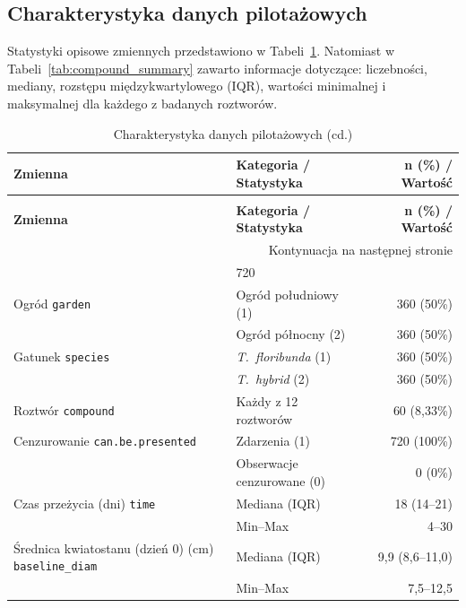 \documentclass[12pt, a4paper]{article}
\begin{document}
\subsection{Charakterystyka danych pilotażowych}
Statystyki opisowe zmiennych przedstawiono w Tabeli~\ref{tab:pilot_summary}. Natomiast w Tabeli~\ref{tab:compound_summary} zawarto informacje dotyczące: liczebności, mediany, rozstępu międzykwartylowego (IQR), wartości minimalnej i maksymalnej dla każdego z badanych roztworów.

\begin{longtable}{p{6cm}lr}
\caption{Charakterystyka danych pilotażowych}
\label{tab:pilot_summary} \\
\toprule
\textbf{Zmienna} & \textbf{Kategoria / Statystyka} & \textbf{n (\%) / Wartość} \\
\midrule
\endfirsthead
\caption[]{Charakterystyka danych pilotażowych (cd.)} \\
\toprule
\textbf{Zmienna} & \textbf{Kategoria / Statystyka} & \textbf{n (\%) / Wartość} \\
\midrule
\endhead
\midrule
\multicolumn{3}{r}{Kontynuacja na następnej stronie} \\
\endfoot
\bottomrule
\endlastfoot
\multicolumn{2}{l}{\textit{Liczba jednostek eksperymentalnych}} & 720 \\
\addlinespace
Ogród \newline \texttt{garden} 
& Ogród południowy (1) 
& 360 (50\%) \\
& Ogród północny (2)   
& 360 (50\%) \\
\addlinespace
Gatunek \newline \texttt{species} 
& \textit{T.~floribunda} (1) 
& 360 (50\%) \\
& \textit{T.~hybrid} (2)     
& 360 (50\%) \\
\addlinespace
Roztwór \newline \texttt{compound} 
& Każdy z 12 roztworów 
& 60 (8{,}33\%) \\
\addlinespace
Cenzurowanie \newline \texttt{can.be.presented} 
& Zdarzenia (1)
& 720 (100\%) \\
& Obserwacje cenzurowane (0)
& 0 (0\%) \\
\addlinespace
Czas przeżycia (dni) \newline \texttt{time} 
& Mediana (IQR) 
& 18 (14--21) \\
& Min--Max      
& 4--30 \\
\addlinespace
Średnica kwiatostanu (dzień 0) (cm) \newline \texttt{baseline\_diam} 
& Mediana (IQR) 
& 9,9 (8,6--11,0) \\
& Min--Max
& 7,5--12,5 \\
\end{longtable}
\end{document}
